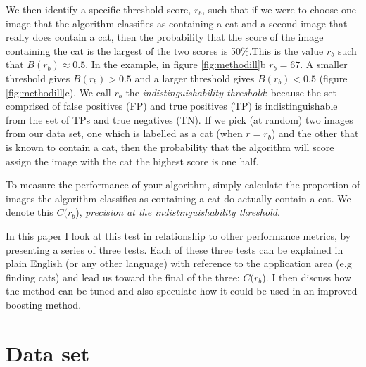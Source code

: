 \documentclass[preprint,12pt]{article}
\begin{document}
We then identify a specific threshold score, $r_b$, such that if we were to choose one image that the algorithm classifies as containing a cat and a second image that really does contain a cat, then the probability that the score of the image containing the cat is the largest of the two scores is 50\%.This is the value $r_b$ such that $B(r_b) \approx 0.5$. In the example, in figure \ref{fig:methodill}b $r_b=67$. A smaller threshold gives $B(r_b) > 0.5$ and a larger threshold gives $B(r_b) < 0.5$ (figure \ref{fig:methodill}c). We call $r_b$ the {\it indistinguishability threshold}: because the set comprised of false positives (FP) and true positives (TP) is indistinguishable from the set of TPs and true negatives (TN). If we pick (at random) two images from our data set, one which is labelled as a cat (when $r=r_b$) and the other that is known to contain a cat, then the probability that the algorithm will score assign the  image with the cat the highest score is one half. 

To measure the performance of your algorithm, simply calculate the proportion of images the algorithm classifies as containing a cat do actually contain a cat. We denote this $C(r_b$), {\it precision at the indistinguishability threshold}.

In this paper I look at this test in relationship to other performance metrics, by presenting a series of three tests. Each of these three tests can be explained in plain English (or any other language) with reference to the application area (e.g finding cats) and lead us toward the final of the three: $C(r_b$). I then discuss how the method can be tuned and also speculate how it could be used in an improved boosting method. 

\section{Data set}
\end{document}
